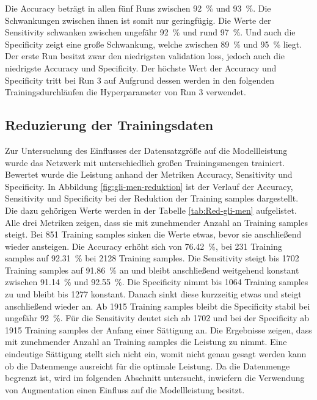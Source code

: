 Die Accuracy beträgt in allen fünf Runs zwischen \SI{92}{\%} und \SI{93}{\%}. Die Schwankungen zwischen ihnen ist somit nur geringfügig.
Die Werte der Sensitivity schwanken zwischen ungefähr \SI{92}{\%} und rund \SI{97}{\%}.
Und auch die Specificity zeigt eine große Schwankung, welche zwischen \SI{89}{\%} und \SI{95}{\%} liegt.
Der erste Run besitzt zwar den niedrigsten validation loss, jedoch auch die niedrigste Accuracy und Specificity.
Der höchste Wert der Accuracy und Specificity tritt bei Run 3 auf
Aufgrund dessen werden in den folgenden Trainingsdurchläufen die Hyperparameter von Run 3 verwendet.
\subsection{Reduzierung der Trainingsdaten}
Zur Untersuchung des Einflusses der Datensatzgröße auf die Modellleistung wurde das Netzwerk mit unterschiedlich großen Trainingsmengen trainiert. 
Bewertet wurde die Leistung anhand der Metriken Accuracy, Sensitivity und Specificity.
In Abbildung \ref{fig:gli-men-reduktion} ist der Verlauf der Accuracy, Sensitivity und Specificity bei der Reduktion der Training samples dargestellt.
Die dazu gehörigen Werte werden in der Tabelle \ref{tab:Red-gli-men} aufgelistet.
Alle drei Metriken zeigen, dass sie mit zunehmender Anzahl an Training samples steigt. 
Bei 851 Training samples sinken die Werte etwas, bevor sie anschließend wieder ansteigen.
Die Accuracy erhöht sich von \SI{76.42}{\percent}, bei 231 Training samples auf \SI{92.31}{\percent} bei 2128 Training samples.
Die Sensitivity steigt bis 1702 Training samples auf \SI{91.86}{\%} an und bleibt anschließend weitgehend konstant zwischen \SI{91.14}{\%} und \SI{92.55}{\%}.
Die Specificity nimmt bis 1064 Training samples zu und bleibt bis 1277 konstant. 
Danach sinkt diese kurzzeitig etwas und steigt anschließend wieder an. 
Ab 1915 Training samples bleibt die Specificity stabil bei ungefähr \SI{92}{\%}.
Für die Sensitivity deutet sich ab 1702 und bei der Specificity ab 1915 Training samples der Anfang einer Sättigung an.
Die Ergebnisse zeigen, dass mit zunehmender Anzahl an Training samples die Leistung zu nimmt.
Eine eindeutige Sättigung stellt sich nicht ein, womit nicht genau gesagt werden kann ob die Datenmenge ausreicht für die optimale Leistung. 
Da die Datenmenge begrenzt ist, wird im folgenden Abschnitt untersucht, inwiefern die Verwendung von Augmentation einen Einfluss auf die Modellleistung besitzt. 
